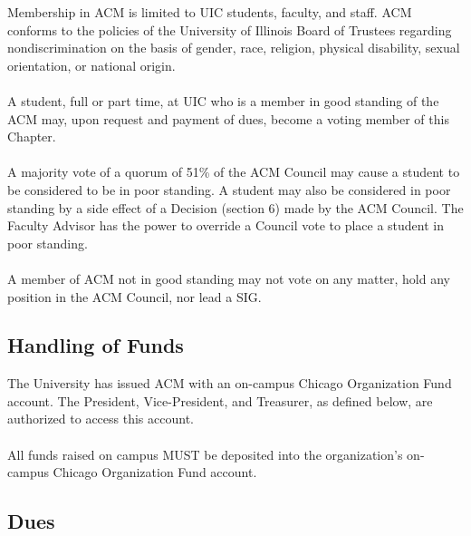 \documentclass[12pt,titlepage]{article}
\begin{document}
Membership in ACM is limited to UIC students, faculty, and staff. ACM conforms to the policies of the University of Illinois Board of Trustees regarding nondiscrimination on the basis of gender, race, religion, physical disability, sexual orientation, or national origin.\\
\\
A student, full or part time, at UIC who is a member in good standing of the ACM may, upon request and payment of dues, become a voting member of this Chapter.\\
\\
A majority vote of a quorum of 51\% of the ACM Council may cause a student to be considered to be in poor standing. A student may also be considered in poor standing by a side effect of a Decision (section 6) made by the ACM Council. The Faculty Advisor has the power to override a Council vote to place a student in poor standing.\\
\\
A member of ACM not in good standing may not vote on any matter, hold any position in the ACM Council, nor lead a SIG.

\subsection{Handling of Funds}

The University has issued ACM with an on-campus Chicago Organization Fund account. The President, Vice-President, and Treasurer, as defined below, are authorized to access this account.\\
\\
All funds raised on campus MUST be deposited into the organization's on-campus Chicago Organization Fund account.

\subsection{Dues}
\end{document}
